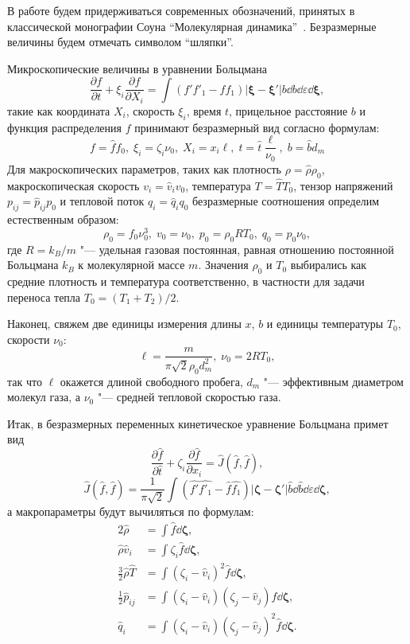 В работе будем придерживаться современных обозначений, принятых 
в классической монографии Соуна ``Молекулярная динамика''~\cite{Sone2007}.
Безразмерные величины будем отмечать символом ``шляпки''.

Микроскопические величины в уравнении Больцмана
\[
	\frac{\partial{f}}{\partial{t}} + \xi_i\frac{\partial{f}}{\partial X_i} = 
	\int (f'f'_1-ff_1)|\boldsymbol{\xi}-\boldsymbol{\xi}'|b\dd b \dd \varepsilon \boldsymbol{\dd\xi},
\]
такие как координата \(X_i\), скорость \(\xi_i\), время \(t\), прицельное расстояние \(b\)
и функция распределения \(f\) принимают безразмерный вид согласно формулам:
\[ f = \hat{f}f_0,\; \xi_i = \zeta_i\nu_0,\; X_i = x_i\ell,\;
	t = \hat{t}\frac{\ell}{\nu_0},\; b = \hat{b}d_m \]
Для макроскопических параметров, таких как плотность \( \rho = \hat{\rho}\rho_0\), макроскопическая скорость \(v_i = \hat{v}_iv_0\),
температура \(T = \hat{T}T_0\), тензор напряжений \(p_{ij} = \hat{p}_{ij}p_0\) и тепловой поток \(q_i = \hat{q}_iq_0\) 
безразмерные соотношения определим естественным образом:
\[ \rho_0 = f_0 \nu_0^3, \; v_0 = \nu_0, \; p_0 = \rho_0RT_0, \; q_0 = p_0\nu_0, \]
где \(R = k_B/m\) "--- удельная газовая постоянная, равная отношению постоянной Больцмана \(k_B\) к молекулярной массе \(m\).
Значения \(\rho_0\) и \(T_0\) выбирались как средние плотность и температура соответственно,
в частности для задачи переноса тепла \(T_0 = (T_1+T_2)/2\).

Наконец, свяжем две единицы измерения длины \(x\), \(b\) и единицы температуры \(T_0\), скорости \(\nu_0\):
\[ \ell = \frac{m}{\pi\sqrt2 \rho_0 d_m^2}, \; \nu_0 = 2RT_0, \]
так что \(\ell\) окажется длиной свободного пробега, \(d_m\) "--- эффективным диаметром молекул газа,
а \(\nu_0\) "--- средней тепловой скоростью газа.

Итак, в безразмерных переменных кинетическое уравнение Больцмана примет вид
\[ \frac{\partial\hat{f}}{\partial\hat{t}} + \zeta_i\frac{\partial\hat{f}}{\partial x_i} = \hat{J}(\hat{f},\hat{f}), \]
\[ 
	\hat{J}(\hat{f},\hat{f}) = \frac1{\pi\sqrt2}\int (\hat{f'}\hat{f'_1}-\hat{f}\hat{f_1})
	|\boldsymbol{\zeta}-\boldsymbol{\zeta}'| \hat{b}\dd \hat{b} \dd \varepsilon \boldsymbol{\dd\zeta},
\]
а макропараметры будут вычиляться по формулам:
\begin{alignat*}{2}
	\hat{\rho} &= \int \hat{f}\boldsymbol{\dd\zeta}, \\
	\hat{\rho}\hat{v}_i &= \int \zeta_i \hat{f}\boldsymbol{\dd\zeta}, \\
	\frac3{2}\hat{\rho}\hat{T} &= \int(\zeta_i-\hat{v}_i)^2\hat{f}\boldsymbol{\dd\zeta}, \\
	\frac1{2}\hat{p}_{ij} &= \int(\zeta_i-\hat{v}_i)(\zeta_j-\hat{v}_j)\hat{f}\boldsymbol{\dd\zeta}, \\
	\hat{q}_i &= \int(\zeta_i-\hat{v}_i)(\zeta_j-\hat{v}_j)^2\hat{f}\boldsymbol{\dd\zeta}.
\end{alignat*}

